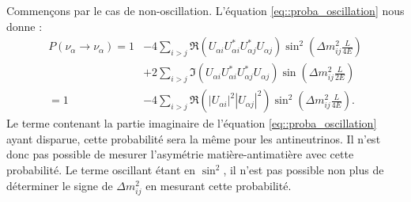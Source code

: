             Commençons par le cas de non-oscillation. L'équation \eqref{eq::proba_oscillation} nous donne :
            \begin{equation}\label{eq::proba_non_oscillation}
                \begin{split}
                    P(\nu_{\alpha}\to\nu_{\alpha}) = 1 & - 4\sum_{i>j}\Re(U_{\alpha i}U_{\alpha i}^*U_{\alpha j}^*U_{\alpha j})\sin^2\left(\Delta m_{ij}^2\frac{L}{4E}\right) \\
                    & + 2\sum_{i>j}\Im(U_{\alpha i}U_{\alpha i}^*U_{\alpha j}^*U_{\alpha j})\sin\left(\Delta m_{ij}^2\frac{L}{2E}\right) \\
                    = 1 & -4\sum_{i>j}\Re(|U_{\alpha i}|^2|U_{\alpha j}|^2)\sin^2\left(\Delta m_{ij}^2\frac{L}{4E}\right).
                \end{split}
            \end{equation}
            Le terme contenant la partie imaginaire de l'équation \eqref{eq::proba_oscillation} ayant disparue, cette probabilité sera la même pour les antineutrinos. Il n'est donc pas possible de mesurer l'asymétrie matière-antimatière avec cette probabilité. Le terme oscillant étant en $\sin^2$, il n'est pas possible non plus de déterminer le signe de $\Delta m_{ij}^2$ en mesurant cette probabilité.
            
